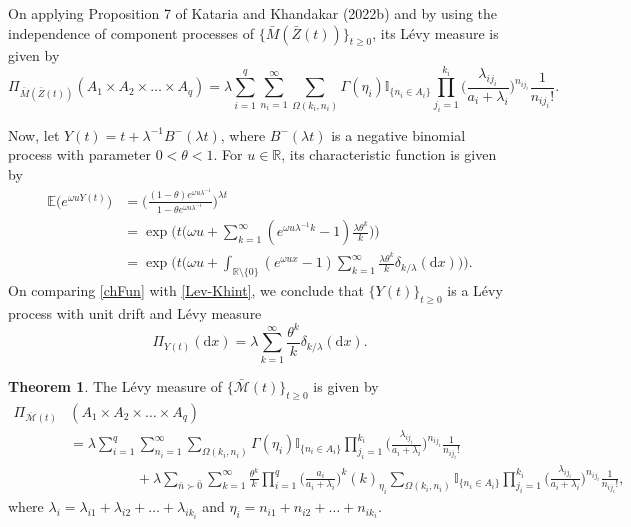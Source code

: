 \documentclass[12pt,oneside,reqno]{amsart}
\numberwithin{equation}{section}
\theoremstyle{definition}
\numberwithin{equation}{section}
\newtheorem{theorem}{\bf Theorem}[section]
\theoremstyle{remarkstyle}
\begin{document}
On applying Proposition 7 of Kataria and Khandakar (2022b) and by using the independence of component processes of $\{\bar{M}(\bar{Z}(t))\}_{t\ge 0}$, its L\'evy measure is given by
\begin{equation}\label{Lev_MZ}
\Pi_{\bar{M}(\bar{Z}(t))}(A_1 \times A_2\times\dots\times A_q)=
\lambda\sum_{i=1}^{q}\sum_{n_i=1}^{\infty}\sum_{\Omega(k_i,n_i)}\Gamma(\eta_i)\mathbb{I}_{\{n_i\in A_i\}}\prod_{j_i=1}^{k_i}\Big(\frac{\lambda_{ij_i}}{a_i+\lambda_i}\Big)^{n_{ij_i}}\frac{1}{n_{ij_i}!}.
\end{equation}
	
Now, let $Y(t)=t+\lambda^{-1}B^- (\lambda t)$, where $B^- (\lambda t)$ is a negative binomial process with parameter $0<\theta<1$. For $u\in\mathbb{R}$, its characteristic function is given by
\begin{align}\label{chFun}
	\mathbb{E}\big(e^{\omega uY(t)}\big)&=\Big(\frac{(1-\theta)e^{\omega u\lambda^{-1}}}{1-\theta e^{\omega u\lambda^{-1}}}\Big)^{\lambda t}\nonumber\\
	&=\exp\Big(t\Big(\omega u+\sum_{k=1}^{\infty}(e^{\omega u\lambda^{-1}k}-1)\frac{\lambda\theta^k}{k}\Big)\Big)\nonumber\\
	&=\exp\Big(t\Big(\omega u+\int_{\mathbb{R}\setminus\{0\}}(e^{\omega ux}-1)\sum_{k=1}^{\infty}\frac{\lambda\theta^k}{k}\delta_{k/\lambda}(\mathrm{d}x)\Big)\Big).
\end{align}
On comparing \eqref{chFun} with \eqref{Lev-Khint}, we conclude that $\{Y(t)\}_{t\ge0}$ is a L\'evy process with unit drift and L\'evy measure
\begin{equation*}\label{Lev_Y}
	\Pi_{Y(t)}(\mathrm{d}x)=\lambda\sum_{k=1}^{\infty}\frac{\theta^k}{k}\delta_{k/\lambda} (\mathrm{d}x).
\end{equation*}

\begin{theorem}
The L\'evy measure of $\{\bar{\mathscr{M}}(t)\}_{t\geq0}$ is given by
{\small	\begin{align}\label{Lev1}
		\Pi_{\bar{\mathscr{M}}(t)}&(A_1 \times A_2\times\dots\times A_q)\nonumber\\
		&=\lambda\sum_{i=1}^{q}\sum_{n_i=1}^{\infty}\sum_{\Omega(k_i,n_i)}\Gamma(\eta_i)\mathbb{I}_{\{n_i\in A_i\}}\prod_{j_i=1}^{k_i}\Big(\frac{\lambda_{ij_i}}{a_i+\lambda_i}\Big)^{n_{ij_i}}\frac{1}{n_{ij_i}!}\nonumber\\
		&\hspace{2cm}+\lambda\sum_{\bar{n}\succ \bar{0}}\sum_{k=1}^{\infty}\frac{\theta^k}{k}\prod_{i=1}^{q}\Big(\frac{a_i}{a_i+\lambda_i}\Big)^{ k}(k)_{\eta_i}
		\sum_{\Omega(k_i,n_i)}\mathbb{I}_{\{n_i\in A_i\}}
		\prod_{j_i=1}^{k_i}\Big(\frac{\lambda_{ij_i}}{a_i+\lambda_i}\Big)^{n_{ij_i}}\frac{1}{n_{ij_i}!},
	\end{align}}
where $\lambda_i=\lambda_{i1}+\lambda_{i2}+\dots+\lambda_{ik_i}$ and $\eta_i=n_{i1}+n_{i2}+\dots+n_{ik_i}$.

\end{theorem}
\end{document}
